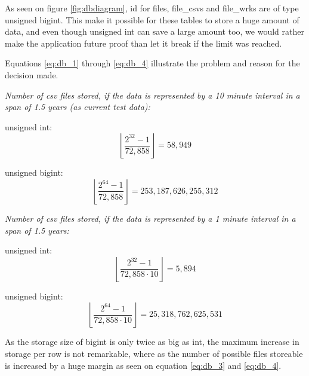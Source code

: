 As seen on figure \ref{fig:dbdiagram}, \textsf{id} for  \textsf{files, file\_csvs} and  \textsf{file\_wrks} are of type \textsf{unsigned bigint}. This make it possible for these tables to store a huge amount of data, and even though \textsf{unsigned int} can save a large amount too, we would rather make the application future proof than let it break if the limit was reached.

Equations \ref{eq:db_1} through \ref{eq:db_4} illustrate the problem and reason for the decision made.

\emph{Number of csv files stored, if the data is represented by a 10 minute interval in a span of 1.5 years (as current test data):}

\textsf{unsigned int}: 
\begin{equation}
\label{eq:db_1}
\left\lfloor \frac{2^{32}-1}{72,858} \right\rfloor = 58,949
\end{equation}

\textsf{unsigned bigint}:
\begin{equation}
\label{eq:db_2}
\left\lfloor \frac{2^{64}-1}{72,858} \right\rfloor = 253,187,626,255,312
\end{equation}

\emph{Number of csv files stored, if the data is represented by a 1 minute interval in a span of 1.5 years:}

\textsf{unsigned int}:
\begin{equation}
\label{eq:db_3}
\left\lfloor \frac{2^{32}-1}{72,858 \cdot 10} \right\rfloor = 5,894
\end{equation}

\textsf{unsigned bigint}:
\begin{equation}
\label{eq:db_4}
\left\lfloor \frac{2^{64}-1}{72,858 \cdot 10} \right\rfloor = 25,318,762,625,531
\end{equation}

As the storage size of \textsf{bigint} is only twice as big as \textsf{int}, the maximum increase in storage per row is not remarkable, where as the number of possible files storeable is increased by a huge margin as seen on equation \ref{eq:db_3} and \ref{eq:db_4}.